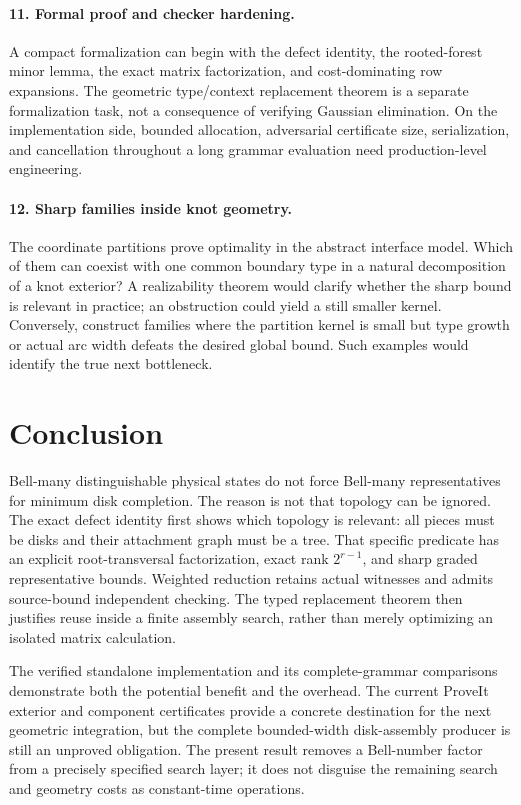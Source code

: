 \documentclass[11pt,a4paper]{article}
\theoremstyle{definition}
\theoremstyle{remark}
\begin{document}
\paragraph{11. Formal proof and checker hardening.}
A compact formalization can begin with the defect identity, the rooted-forest minor
lemma, the exact matrix factorization, and cost-dominating row expansions. The
geometric type/context replacement theorem is a separate formalization task, not a
consequence of verifying Gaussian elimination. On the implementation side, bounded
allocation, adversarial certificate size, serialization, and cancellation throughout
a long grammar evaluation need production-level engineering.

\paragraph{12. Sharp families inside knot geometry.}
The coordinate partitions prove optimality in the abstract interface model. Which of
them can coexist with one common boundary type in a natural decomposition of a knot
exterior? A realizability theorem would clarify whether the sharp bound is relevant
in practice; an obstruction could yield a still smaller kernel. Conversely, construct
families where the partition kernel is small but type growth or actual arc width defeats
the desired global bound. Such examples would identify the true next bottleneck.

\section{Conclusion}
Bell-many distinguishable physical states do not force Bell-many representatives for
minimum disk completion. The reason is not that topology can be ignored. The exact
defect identity first shows which topology is relevant: all pieces must be disks and
their attachment graph must be a tree. That specific predicate has an explicit
root-transversal factorization, exact rank $2^{r-1}$, and sharp graded representative
bounds. Weighted reduction retains actual witnesses and admits source-bound independent
checking. The typed replacement theorem then justifies reuse inside a finite assembly
search, rather than merely optimizing an isolated matrix calculation.

The verified standalone implementation and its complete-grammar comparisons demonstrate
both the potential benefit and the overhead. The current ProveIt exterior and component
certificates provide a concrete destination for the next geometric integration, but the
complete bounded-width disk-assembly producer is still an unproved obligation. The
present result removes a Bell-number factor from a precisely specified search layer;
it does not disguise the remaining search and geometry costs as constant-time operations.
\end{document}
